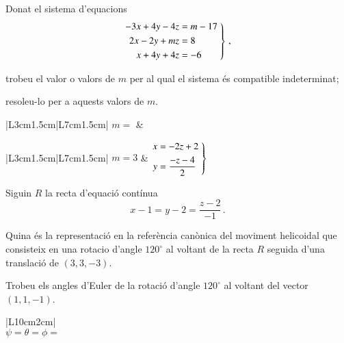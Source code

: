 \documentclass[10pt,catalan]{article}
\begin{document}
\begin{enunciat}
Donat el sistema d'equacions
\[
  \left.\aligned - 3 x + 4 y - 4 z &= m - 17 \\ 2 x - 2 y + m z &= 8 \\ x + 4 y + 4 z &= -6 \endaligned\;\right\}\,,
\]
\begin{apartats}
\item trobeu el valor o valors de $m$ per al qual el sistema és compatible indeterminat;
\item resoleu-lo per a aquests valors de $m$.
\end{apartats}
\end{enunciat}

\begin{quadricula}
\begin{tabular}{|L{3cm}{1.5cm}|L{7cm}{1.5cm}|}
\hline
$m=$ & \\
\hline
\end{tabular}
\end{quadricula}

\begin{solucio}
\begin{center}
\begin{tabular}{|L{3cm}{1.5cm}|L{7cm}{1.5cm}|}
\hline
$m=3$ & $\left.\aligned x &= - 2 z + 2 \\ y &= \frac{- z -4}{2} \endaligned\;\right\}$\\
\hline
\end{tabular}
\end{center}
\end{solucio}





\begin{enunciat}
Siguin $R$ la recta d'equació contínua
\[
  x - 1 = y - 2 = \frac{z - 2}{-1}\,.
\]
\begin{apartats}
\item Quina és la representació en la referència canònica del moviment helicoidal que consisteix en una rotacio d'angle $120^\circ$ al voltant de la recta $R$ seguida d'una translació de $(3,3,-3)$.
\item Trobeu els angles d'Euler de la rotació d'angle $120^\circ$ al voltant del vector $(1,1,-1)$.
\end{apartats}
\end{enunciat}

\begin{quadricula}
\begin{tabular}{|L{10cm}{2cm}|}
\hline
  \\
\hline
{}
{$\psi=$\hspace{3.5cm}$\theta=$\hspace{3.5cm}$\phi=$\hspace{3.5cm}} \\
\hline
\end{tabular}
\end{quadricula}
\end{document}
